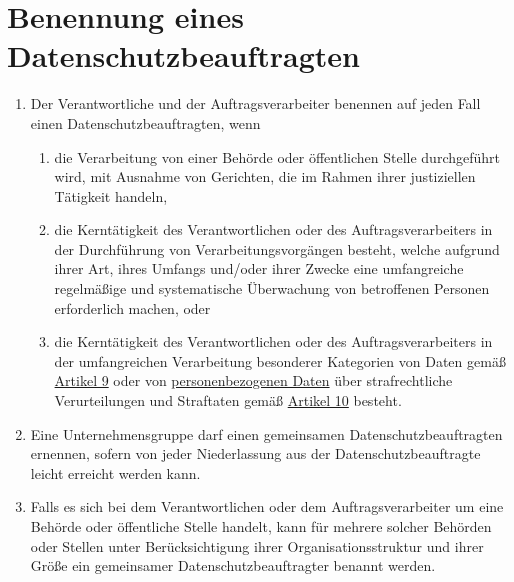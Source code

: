 \chapter{Benennung eines Datenschutzbeauftragten}
\label{ch:37}


\begin{enumerate}

  \item Der Verantwortliche und der Auftragsverarbeiter benennen auf jeden Fall einen Datenschutzbeauftragten, wenn
  \label{itm:37-1}

  \begin{enumerate}
  
    \item die Verarbeitung von einer Behörde oder öffentlichen Stelle durchgeführt wird, mit Ausnahme von Gerichten, die
     im Rahmen ihrer justiziellen Tätigkeit handeln,
    \label{itm:37-1a}

    \item die Kerntätigkeit des Verantwortlichen oder des Auftragsverarbeiters in der Durchführung von
     Verarbeitungsvorgängen besteht, welche aufgrund ihrer Art, ihres Umfangs und/oder ihrer Zwecke eine umfangreiche
     regelmäßige und systematische Überwachung von betroffenen Personen erforderlich machen, oder
    \label{itm:37-1b}

    \item die Kerntätigkeit des Verantwortlichen oder des Auftragsverarbeiters in der umfangreichen Verarbeitung
     besonderer Kategorien von Daten gemäß \hyperref[ch:9]{Artikel 9} oder von \hyperref[itm:04-1]{personenbezogenen Daten} über
     strafrechtliche Verurteilungen und Straftaten gemäß \hyperref[ch:10]{Artikel 10} besteht.
    \label{itm:37-1c}

  \end{enumerate}

  \item Eine Unternehmensgruppe darf einen gemeinsamen Datenschutzbeauftragten ernennen, sofern von jeder Niederlassung
   aus der Datenschutzbeauftragte leicht erreicht werden kann.
  \label{itm:37-2}

  \item Falls es sich bei dem Verantwortlichen oder dem Auftragsverarbeiter um eine Behörde oder öffentliche Stelle
   handelt, kann für mehrere solcher Behörden oder Stellen unter Berücksichtigung ihrer Organisationsstruktur und ihrer
   Größe ein gemeinsamer Datenschutzbeauftragter benannt werden.
  \label{itm:37-3}


\end{enumerate}
